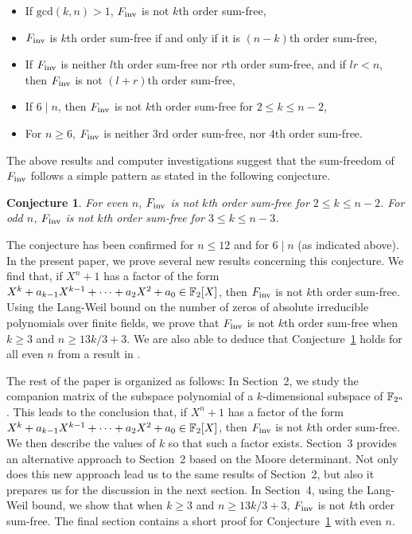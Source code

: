 \documentclass{amsart}
\newtheorem{conj}[thm]{Conjecture}
\numberwithin{equation}{section}
\theoremstyle{definition}
\newcommand{\f}{\Bbb F}
\newcommand{\fin}{F_{\text{\rm inv}}}
\begin{document}
\begin{itemize}

\item If $\text{gcd}(k,n)>1$, $\fin$ is not $k$th order sum-free,

\item $\fin$ is $k$th order sum-free if and only if it is $(n-k)$th order sum-free,

\item If $\fin$ is neither $l$th order sum-free nor $r$th order sum-free, and if $lr<n$, then $\fin$ is not $(l+r)$th order sum-free,

\item If $6\mid n$, then $\fin$ is not $k$th order sum-free for $2\le k\le n-2$,

\item For $n\ge 6$, $\fin$ is neither $3$rd order sum-free, nor $4$th order sum-free.

\end{itemize}
The above results and computer investigations suggest that the sum-freedom of $\fin$ follows a simple pattern as stated in the following conjecture.

\begin{conj}\label{Conj1.1}\cite{Carlet-pre}
For even $n$, $\fin$ is not $k$th order sum-free for $2\le k\le n-2$. For odd $n$, $\fin$ is not $k$th order sum-free for $3\le k\le n-3$.
\end{conj}

The conjecture has been confirmed for $n\le 12$ \cite{Carlet-pre} and for $6\mid n$ (as indicated above). In the present paper, we prove several new results concerning this conjecture. We find that, if $X^n+1$ has a factor of the form $X^k+a_{k-1}X^{k-1}+\cdots+a_2X^2+a_0\in\f_2[X]$, then  $\fin$ is not $k$th order sum-free. Using the Lang-Weil bound on the number of zeros of absolute irreducible polynomials over finite fields, we prove that $\fin$ is not $k$th order sum-free when $k\ge 3$ and $n\ge 13k/3+3$. We are also able to deduce that Conjecture~\ref{Conj1.1} holds for all even $n$ from a result in \cite{Carlet-pre}.

The rest of the paper is organized as follows: In Section~2, we study the companion matrix of the subspace polynomial of a $k$-dimensional subspace of $\f_{2^n}$. This leads to the conclusion that, if $X^n+1$ has a factor of the form $X^k+a_{k-1}X^{k-1}+\cdots+a_2X^2+a_0\in\f_2[X]$, then $\fin$ is not $k$th order sum-free. We then describe the values of $k$ so that such a factor exists. Section~3 provides an alternative approach to Section~2 based on the Moore determinant. Not only does this new approach lead us to the same results of Section~2, but also it prepares us for the discussion in the next section. In Section~4, using the Lang-Weil bound, we show that when $k\ge 3$ and $n\ge 13k/3+3$, $\fin$ is not $k$th order sum-free. The final section contains a short proof for Conjecture~\ref{Conj1.1} with even $n$.
\end{document}
